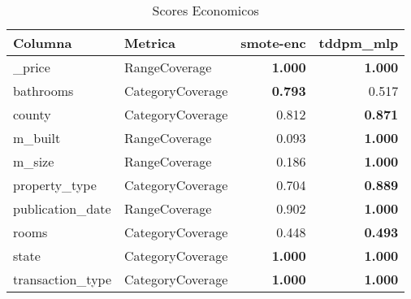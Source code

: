 \begin{table}[H]
\centering
\caption{Scores Economicos}
\label{table-coverage-economicos-b-2}
\begin{tabular}{|l|l|r|r|}
\hline
\rowcolor[gray]{0.8}
Columna & Metrica & smote-enc & tddpm\_mlp \\
\hline \_price & RangeCoverage & \bfseries 1.000 & \bfseries 1.000 \\
\hline bathrooms & CategoryCoverage & \bfseries 0.793 & 0.517 \\
\hline county & CategoryCoverage & 0.812 & \bfseries 0.871 \\
\hline m\_built & RangeCoverage & 0.093 & \bfseries 1.000 \\
\hline m\_size & RangeCoverage & 0.186 & \bfseries 1.000 \\
\hline property\_type & CategoryCoverage & 0.704 & \bfseries 0.889 \\
\hline publication\_date & RangeCoverage & 0.902 & \bfseries 1.000 \\
\hline rooms & CategoryCoverage & 0.448 & \bfseries 0.493 \\
\hline state & CategoryCoverage & \bfseries 1.000 & \bfseries 1.000 \\
\hline transaction\_type & CategoryCoverage & \bfseries 1.000 & \bfseries 1.000 \\
\hline
\end{tabular}
\end{table}
